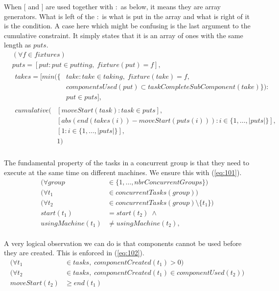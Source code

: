   When $[$ and $]$ are used together with $:$ as below, it means they are array generators. What is left of the $:$ is what is put in the array and what is right of it is the condition. A case here which might be confusing is the last argument to the cumulative constraint. It simply states that it is an array of ones with the same length as $puts$.
 \begin{equation}
 \begin{aligned}\label{eq:100}
 &(\forall f \in fixtures) \\
 &puts = [put : put \in putting, \; fixture(put) = f], \\
 &\begin{aligned}
 takes = [min(\{&take : take \in taking, \; fixture(take) = f,\\ &componentsUsed(put) \subset taskCompleteSubComponent(take)\}) : \\
 &put \in puts], 
 \end{aligned}\\
 &\begin{aligned}
 cumulative(&[moveStart(task) : task \in puts], \\ &[abs(end(takes(i))-moveStart(puts(i))) : i \in \{1 , \ldots , |puts|\}], \\
 &[1 : i \in \{1 , \ldots , |puts|\}],\\
 &1)
 \end{aligned}\\
 \end{aligned}
 \end{equation}

  \noindent The fundamental property of the tasks in a concurrent group is that they need to execute at the same time on different machines. We ensure this with (\ref{eq:101}).
 \begin{equation}
 \begin{aligned}\label{eq:101}
 (\forall group &\in \{1 , \ldots , nbrConcurrentGroups\}) \\
 (\forall t_1 &\in concurrentTasks(group)) \\
 (\forall t_2 &\in concurrentTasks(group) \setminus \{t_1\}) \\
 start(t_1) &= start(t_2) \; \land \\
 usingMachine(t_1) &\neq usingMachine(t_2), \\
 \end{aligned}
 \end{equation}

  \noindent A very logical observation we can do is that components cannot be used before they are created. This is enforced in (\ref{eq:102}).
 \begin{equation}
 \begin{aligned}\label{eq:102}
 (\forall t_1 &\in tasks, \; componentCreated(t_1) > 0) \\
 (\forall t_2 &\in tasks, \; componentCreated(t_1) \in componentUsed(t_2)) \\
 moveStart(t_2) &\geq end(t_1) \\
 \end{aligned}
 \end{equation}

